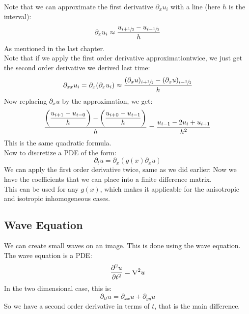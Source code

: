 \documentclass[12pt]{article}
\begin{document}
Note that we can approximate the first derivative
$\partial_x u_i$ with a line
(here $h$ is the interval):
\[ \partial_x u_i \approx \dfrac{u_{i + \sfrac{1}{2}}
- u_{i - \sfrac{1}{2}}}{h} \]
As mentioned in the last chapter. \\

Note that if we apply the first order derivative
approximationtwice, we just get the second order 
derivative we derived last time:
\[ \partial_{xx} u_i
= \partial_{x}(\partial_x u_i) 
\approx \dfrac{(\partial_x u)_{i + \sfrac{1}{2}}
- (\partial_x u)_{i - \sfrac{1}{2}}}{h} \]
Now replacing $\partial_x u$ by the
approximation, we get: 
\[ \dfrac{\left( \dfrac{u_{i + 1}
- u_{i - 0}}{h} \right) - \left( \dfrac{u_{i + 0}
- u_{i - 1}}{h} \right)}{h}
= \dfrac{u_{i-1} - 2u_{i} + u_{i+1}}{h^2} \]
This is the same quadratic formula. \\

Now to discretize a PDE of the form:
\[ \partial_t u
= \partial_x(g(x) \partial_x u) \]
We can apply the first order derivative
twice, same as we did earlier:
Now we have the coefficients that we can place
into a finite difference matrix. \\
This can be used for any $g(x)$,
which makes it applicable for the anisotropic
and isotropic inhomogeneous cases. \\

\newpage

\subsection*{Wave Equation}

We can create small waves on an image.
This is done using the wave equation. \\

The wave equation is a PDE:
\[ \dfrac{\partial ^2u}{\partial t^2} = \nabla^2 u \]
In the two dimensional case, this is:
\[ \partial_{tt}u = \partial_{xx} u + \partial_{yy} u \]
So we have a second order derivative in terms of $t$,
that is the main difference. \\
\end{document}
